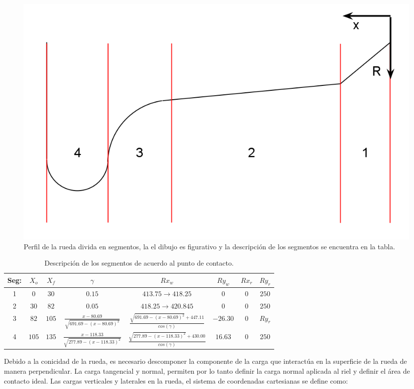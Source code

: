 \documentclass[main]{subfiles}
\begin{document}
\begin{figure}[!htbp]
\centering
\includegraphics[scale=0.3]{WheelProf.png}
  \caption{Perfil de la rueda divida en segmentos, la el dibujo es figurativo y la descripción de los segmentos se encuentra en la tabla.}
  \label{fig:DataGraf}
\end{figure}  

\begin{center}
\begin{table}[!htbp]
\caption{Descripción de los segmentos de acuerdo al punto de contacto.}
\begin{tabular}{|c|c|c|c|c|c|c|c|}
\hline
Seg:& $X_o$ & $X_f$ &  $\gamma$ & $Rx_w$ & $Ry_w$ & $Rx_r$ & $Ry_r$ \\
\hline
1& $0$ & $30$ & $0.15$ & $413.75 \rightarrow 418.25$  & $0$ & $0$ & $250$ \\
\hline
2& $30$ & $82$ &  $0.05$ & $418.25 \rightarrow 420.845$  & $0$ & $0$ & $250$  \\
\hline
3& $82$ & $105$ &  $\frac{x-80.69}{\sqrt{691.69-(x-80.69)^2}}$ & $\frac{\sqrt{691.69-(x-80.69)^2}+447.11}{cos(\gamma)}$ &   $-26.30$ & $0$ & $Ry_r$ \\
\hline
4& $105$ & $135$ &  $\frac{x-118.33}{\sqrt{277.89-(x-118.33)^2}}$ & $\frac{\sqrt{277.89-(x-118.33)^2}+430.00}{cos(\gamma)}$ &   $16.63$ & $0$ & $250$ \\
\hline
\end{tabular}
\end{table}
\end{center}


Debido a la conicidad de la rueda, es necesario descomponer la componente de la carga que interactúa en la superficie de la rueda de manera perpendicular. La carga tangencial y normal, permiten por lo tanto definir la carga normal aplicada al riel y definir el área de contacto ideal. Las cargas verticales y laterales en la rueda, el sistema de coordenadas cartesianas se define como:
\end{document}
